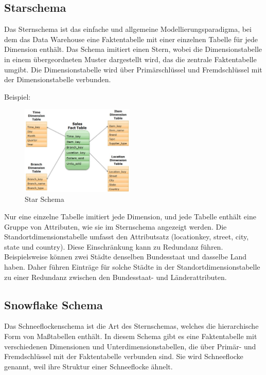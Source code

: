   \subsection{Starschema}

  Das Sternschema ist das einfache und allgemeine Modellierungsparadigma, bei dem das Data Warehouse eine Faktentabelle mit einer einzelnen Tabelle für jede Dimension enthält. Das Schema imitiert einen Stern, wobei die Dimensionstabelle in einem übergeordneten Muster dargestellt wird, das die zentrale Faktentabelle umgibt. Die Dimensionstabelle wird über Primärschlüssel und Fremdschlüssel mit der Dimensionstabelle verbunden.

  Beispiel:

  \begin{figure}
    \begin{center}
      \includegraphics[width=0.48\textwidth]{Content/images/dwh/star.png}
    \end{center}
    \caption{Star Schema}
  \end{figure}
  Nur eine einzelne Tabelle imitiert jede Dimension, und jede Tabelle enthält eine Gruppe von Attributen, wie sie im Sternschema angezeigt werden. Die Standortdimensionstabelle umfasst den Attributsatz (locationkey, street, city, state und country). Diese Einschränkung kann zu Redundanz führen. Beispielsweise können zwei Städte denselben Bundesstaat und dasselbe Land haben. Daher führen Einträge für solche Städte in der Standortdimensionstabelle zu einer Redundanz zwischen den Bundesstaat- und Länderattributen.

  \subsection{Snowflake Schema}

  Das Schneeflockenschema ist die Art des Sternschemas, welches die hierarchische Form von Maßtabellen enthält. In diesem Schema gibt es eine Faktentabelle mit verschiedenen Dimensionen und Unterdimensionstabellen, die über Primär- und Fremdschlüssel mit der Faktentabelle verbunden sind. Sie wird Schneeflocke genannt, weil ihre Struktur einer Schneeflocke ähnelt.

